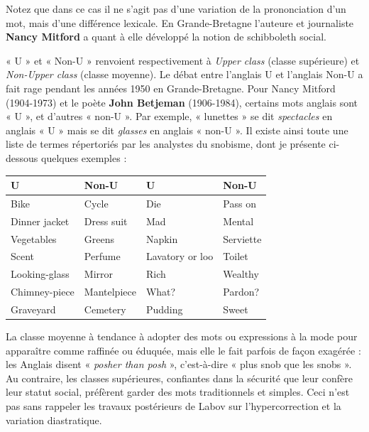 Notez que dans ce cas il ne s’agit pas d’une variation de la prononciation d’un mot, mais d’une différence lexicale. En Grande-Bretagne l’auteure et journaliste \textbf{Nancy Mitford} a quant à elle développé la notion de schibboleth social.

« U » et « Non-U » renvoient respectivement à \textit{Upper class} (classe supérieure) et \textit{Non-Upper class} (classe moyenne). Le débat entre l’anglais U et l’anglais Non-U a fait rage pendant les années 1950 en Grande-Bretagne. Pour Nancy Mitford (1904-1973) et le poète \textbf{John Betjeman} (1906-1984), certains mots anglais sont « U », et d’autres « non-U ». Par exemple, « lunettes » se dit \textit{spectacles} en anglais « U » mais se dit \textit{glasses} en anglais « non-U ». Il existe ainsi toute une liste de termes répertoriés par les analystes du snobisme, dont je présente ci-dessous quelques exemples :

\begin{center}\small
\begin{tabular}{@{}llll@{}}
\toprule
U & Non-U & U & Non-U\\
\midrule
Bike & Cycle & Die & Pass on\\
Dinner jacket & Dress suit & Mad & Mental\\
Vegetables & Greens & Napkin & Serviette\\
Scent & Perfume & Lavatory or loo & Toilet\\
Looking-glass & Mirror & Rich & Wealthy\\
Chimney-piece & Mantelpiece & What? & Pardon?\\
Graveyard & Cemetery & Pudding & Sweet\\
\bottomrule
\end{tabular}
\end{center}

La classe moyenne à tendance à adopter des mots ou expressions à la mode pour apparaître comme raffinée ou éduquée, mais elle le fait parfois de façon exagérée : les Anglais disent « \textit{posher than posh} », c’est-à-dire « plus snob que les snobs ». Au contraire, les classes supérieures, confiantes dans la sécurité que leur confère leur statut social, préfèrent garder des mots traditionnels et simples. Ceci n’est pas sans rappeler les travaux postérieurs de Labov sur l’hypercorrection et la variation diastratique.


